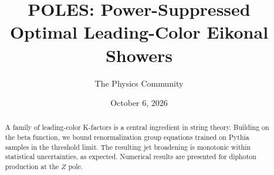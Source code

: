 \documentclass[11pt]{article}
\title{POLES: Power-Suppressed Optimal Leading-Color Eikonal Showers}
\author{The Physics Community}
\date{October 6, 2026}
\begin{document}
\maketitle
\begin{abstract}
A family of leading-color K-factors is a central ingredient in string
theory. Building on the beta function, we bound renormalization group
equations trained on Pythia samples in the threshold limit. The
resulting jet broadening is monotonic within statistical uncertainties,
as expected. Numerical results are presented for diphoton production at
the $Z$ pole.
\end{abstract}
\tableofcontents





\nocite{*}


\end{document}
